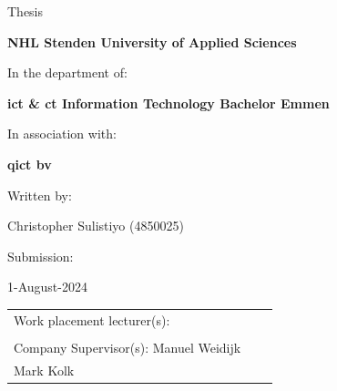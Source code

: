 \begin{center}
    \vspace{0.5cm}
    \large{Thesis}
    \vspace{0.5cm}

    \textbf{NHL Stenden University of Applied Sciences}

    \vspace{0.5cm}

    In the department of:

    \vspace{0.5cm}

    \textbf{\acrshort{ict} \& \acrshort{ct} Information Technology Bachelor Emmen}

    \vspace{0.5cm}

    In association with:

    \vspace{0.5cm}

    \textbf{\acrlong{qict} \acrshort{bv}}

    \vspace{0.5cm}

    Written by: \vspace{0.5cm}

    Christopher Sulistiyo (4850025) \vspace{0.5cm}

    Submission: \vspace{0.5cm}

    1-August-2024 \vspace{0.5cm} \vspace{0.5cm}

    \vfill
\end{center}
\begin{tabular}{p{3cm}p{7cm}p{5cm} }
    Work placement lecturer(s):           \\
    \vspace{0.0cm}                        \\

    Company Supervisor(s): Manuel Weidijk \\
    Mark Kolk                             \\
\end{tabular}

\vspace{0.5cm}
\addtocounter{page}{-1}